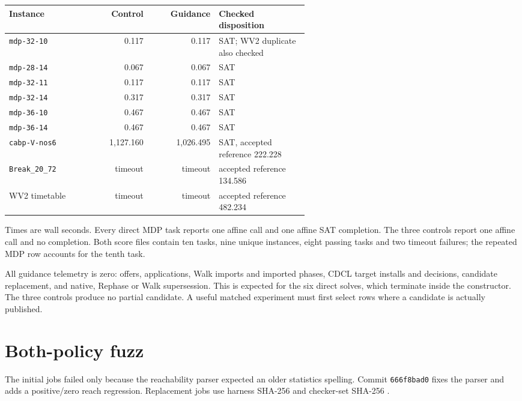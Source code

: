 \documentclass[11pt]{article}
\begin{document}
\begin{center}
\begin{tabular}{@{}p{0.28\linewidth}rrp{0.30\linewidth}@{}}
\toprule
Instance & Control & Guidance & Checked disposition \\
\midrule
\texttt{mdp-32-10} & 0.117 & 0.117 & SAT; WV2 duplicate also checked \\
\texttt{mdp-28-14} & 0.067 & 0.067 & SAT \\
\texttt{mdp-32-11} & 0.117 & 0.117 & SAT \\
\texttt{mdp-32-14} & 0.317 & 0.317 & SAT \\
\texttt{mdp-36-10} & 0.467 & 0.467 & SAT \\
\texttt{mdp-36-14} & 0.467 & 0.467 & SAT \\
\texttt{cabp-V-nos6} & 1,127.160 & 1,026.495 & SAT, accepted reference 222.228 \\
\texttt{Break\_20\_72} & timeout & timeout & accepted reference 134.586 \\
WV2 timetable & timeout & timeout & accepted reference 482.234 \\
\bottomrule
\end{tabular}
\end{center}

Times are wall seconds. Every direct MDP task reports one affine call and one
affine SAT completion. The three controls report one affine call and no
completion. Both score files contain ten tasks, nine unique instances, eight
passing tasks and two timeout failures; the repeated MDP row accounts for the
tenth task.

All guidance telemetry is zero: offers, applications, Walk imports and imported
phases, CDCL target installs and decisions, candidate replacement, and native,
Rephase or Walk supersession. This is expected for the six direct solves, which
terminate inside the constructor. The three controls produce no partial
candidate. A useful matched experiment must first select rows where a candidate
is actually published.

\section*{Both-policy fuzz}

The initial jobs failed only because the reachability parser expected an older
statistics spelling. Commit \texttt{666f8bad0} fixes the parser and adds a
positive/zero reach regression. Replacement jobs use harness SHA-256
\texttt{}
and checker-set SHA-256
\texttt{}.
\end{document}
